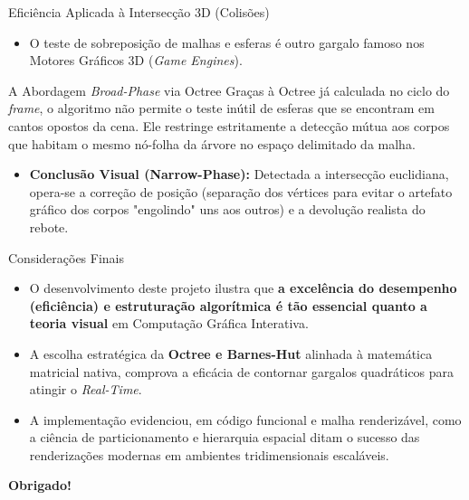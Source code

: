 \documentclass[10pt, aspectratio=169]{beamer}
\begin{document}
\begin{frame}{Eficiência Aplicada à Intersecção 3D (Colisões)}
    \begin{itemize}
        \item O teste de sobreposição de malhas e esferas é outro gargalo famoso nos Motores Gráficos 3D (\textit{Game Engines}).
    \end{itemize}
    
    \begin{block}{A Abordagem \textit{Broad-Phase} via Octree}
        Graças à Octree já calculada no ciclo do \textit{frame}, o algoritmo não permite o teste inútil de esferas que se encontram em cantos opostos da cena.
        Ele restringe estritamente a detecção mútua aos corpos que habitam o mesmo nó-folha da árvore no espaço delimitado da malha.
    \end{block}

    \begin{itemize}
        \item \textbf{Conclusão Visual (Narrow-Phase):} Detectada a intersecção euclidiana, opera-se a correção de posição (separação dos vértices para evitar o artefato gráfico dos corpos "engolindo" uns aos outros) e a devolução realista do rebote.
    \end{itemize}
\end{frame}

\begin{frame}{Considerações Finais}
    \begin{itemize}
        \item O desenvolvimento deste projeto ilustra que \textbf{a excelência do desempenho (eficiência) e estruturação algorítmica é tão essencial quanto a teoria visual} em Computação Gráfica Interativa.
        \item A escolha estratégica da \textbf{Octree e Barnes-Hut} alinhada à matemática matricial nativa, comprova a eficácia de contornar gargalos quadráticos para atingir o \textit{Real-Time}.
        \item A implementação evidenciou, em código funcional e malha renderizável, como a ciência de particionamento e hierarquia espacial ditam o sucesso das renderizações modernas em ambientes tridimensionais escaláveis.
    \end{itemize}
    
    \vspace{0.5cm}
    \centering
    \textbf{Obrigado!}
\end{frame}
\end{document}
